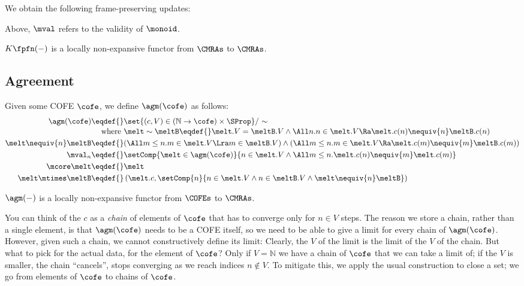 We obtain the following frame-preserving updates:
Above, $\mval$ refers to the validity of $\monoid$.

$K \fpfn (-)$ is a locally non-expansive functor from $\CMRAs$ to $\CMRAs$.

\subsection{Agreement}

Given some COFE $\cofe$, we define $\agm(\cofe)$ as follows:
\begin{align*}
  \agm(\cofe) \eqdef{}& \set{(c, V) \in (\mathbb{N} \to \cofe) \times \SProp}/\ {\sim} \\[-0.2em]
  \textnormal{where }& \melt \sim \meltB \eqdef{} \melt.V = \meltB.V \land 
    \All n. n \in \melt.V \Ra \melt.c(n) \nequiv{n} \meltB.c(n)  \\
  \melt \nequiv{n} \meltB \eqdef{}& (\All m \leq n. m \in \melt.V \Lra m \in \meltB.V) \land (\All m \leq n. m \in \melt.V \Ra \melt.c(m) \nequiv{m} \meltB.c(m)) \\
  \mval_n \eqdef{}& \setComp{\melt \in \agm(\cofe)}{ n \in \melt.V \land \All m \leq n. \melt.c(n) \nequiv{m} \melt.c(m) } \\
  \mcore\melt \eqdef{}& \melt \\
  \melt \mtimes \meltB \eqdef{}& \left(\melt.c, \setComp{n}{n \in \melt.V \land n \in \meltB.V \land \melt \nequiv{n} \meltB }\right)
\end{align*}

$\agm(-)$ is a locally non-expansive functor from $\COFEs$ to $\CMRAs$.

You can think of the $c$ as a \emph{chain} of elements of $\cofe$ that has to converge only for $n \in V$ steps.
The reason we store a chain, rather than a single element, is that $\agm(\cofe)$ needs to be a COFE itself, so we need to be able to give a limit for every chain of $\agm(\cofe)$.
However, given such a chain, we cannot constructively define its limit: Clearly, the $V$ of the limit is the limit of the $V$ of the chain.
But what to pick for the actual data, for the element of $\cofe$?
Only if $V = \mathbb{N}$ we have a chain of $\cofe$ that we can take a limit of; if the $V$ is smaller, the chain ``cancels'', \ie stops converging as we reach indices $n \notin V$.
To mitigate this, we apply the usual construction to close a set; we go from elements of $\cofe$ to chains of $\cofe$.

